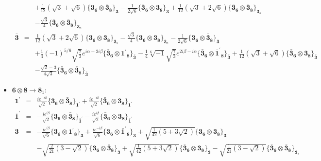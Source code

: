 \documentclass[english]{article}
\newcommand{\subcg}[3]{\big\{ {#1}\otimes{#2}\big\}^{}_{#3}}
\newcommand{\rep}[1]{\mathbf{#1}}
\begin{document}
\begin{itemize}
\begin{eqnarray*}
 & & +\frac{1}{12} \left(\sqrt{3}+\sqrt{6}\right)\subcg{\rep{3}_{\rep{6}}}{\rep{\bar{3}}_{\rep{8}}}{\rep{3}}-\frac{1}{2 \sqrt{6}}\subcg{\rep{\bar{3}}_{\rep{6}}}{\rep{3}_{\rep{8}}}{\rep{3}}+\frac{1}{12} \left(\sqrt{3}+2 \sqrt{6}\right)\subcg{\rep{\bar{3}}_{\rep{6}}}{\rep{\bar{3}}_{\rep{8}}}{\rep{3}_{s}} \\ 
 & & -\frac{\sqrt{3}}{4}\subcg{\rep{\bar{3}}_{\rep{6}}}{\rep{\bar{3}}_{\rep{8}}}{\rep{3}_{a}}
\\
\rep{\bar{3}} &=& \frac{1}{12} \left(\sqrt{3}+2 \sqrt{6}\right)\subcg{\rep{3}_{\rep{6}}}{\rep{3}_{\rep{8}}}{\rep{\bar{3}}_{s}}-\frac{\sqrt{3}}{4}\subcg{\rep{3}_{\rep{6}}}{\rep{3}_{\rep{8}}}{\rep{\bar{3}}_{a}}-\frac{1}{2 \sqrt{6}}\subcg{\rep{3}_{\rep{6}}}{\rep{\bar{3}}_{\rep{8}}}{\rep{\bar{3}}} \\ 
 & & +\frac{1}{4} (-1)^{5/6} \sqrt{\frac{7}{3}} e^{i \alpha -2 i \beta }\subcg{\rep{\bar{3}}_{\rep{6}}}{\rep{1^{\prime}}_{\rep{8}}}{\rep{\bar{3}}}-\frac{1}{4} \sqrt[6]{-1} \sqrt{\frac{7}{3}} e^{2 i \beta -i \alpha }\subcg{\rep{\bar{3}}_{\rep{6}}}{\rep{\bar{1}^{\prime}}_{\rep{8}}}{\rep{\bar{3}}}+\frac{1}{12} \left(\sqrt{3}+\sqrt{6}\right)\subcg{\rep{\bar{3}}_{\rep{6}}}{\rep{3}_{\rep{8}}}{\rep{\bar{3}}} \\ 
 & & -\frac{\sqrt{2}-3}{4 \sqrt{3}}\subcg{\rep{\bar{3}}_{\rep{6}}}{\rep{\bar{3}}_{\rep{8}}}{\rep{\bar{3}}}
\end{eqnarray*}
\item $\rep{6}\otimes\rep{8}\to\rep{8}_{1}$:
\begin{eqnarray*}
\rep{1^{\prime}} &=& \frac{i e^{-i \beta }}{\sqrt{2}}\subcg{\rep{3}_{\rep{6}}}{\rep{\bar{3}}_{\rep{8}}}{\rep{1^{\prime}}}+\frac{i e^{-i \beta }}{\sqrt{2}}\subcg{\rep{\bar{3}}_{\rep{6}}}{\rep{3}_{\rep{8}}}{\rep{1^{\prime}}}
\\
\rep{\bar{1}^{\prime}} &=& -\frac{i e^{i \beta }}{\sqrt{2}}\subcg{\rep{3}_{\rep{6}}}{\rep{\bar{3}}_{\rep{8}}}{\rep{\bar{1}^{\prime}}}-\frac{i e^{i \beta }}{\sqrt{2}}\subcg{\rep{\bar{3}}_{\rep{6}}}{\rep{3}_{\rep{8}}}{\rep{\bar{1}^{\prime}}}
\\
\rep{3} &=& -\frac{i e^{i \beta }}{\sqrt{6}}\subcg{\rep{3}_{\rep{6}}}{\rep{1^{\prime}}_{\rep{8}}}{\rep{3}}+\frac{i e^{-i \beta }}{\sqrt{6}}\subcg{\rep{3}_{\rep{6}}}{\rep{\bar{1}^{\prime}}_{\rep{8}}}{\rep{3}}+\sqrt{\frac{1}{42} \left(5+3 \sqrt{2}\right)}\subcg{\rep{3}_{\rep{6}}}{\rep{3}_{\rep{8}}}{\rep{3}} \\ 
 & & -\sqrt{\frac{2}{21} \left(3-\sqrt{2}\right)}\subcg{\rep{3}_{\rep{6}}}{\rep{\bar{3}}_{\rep{8}}}{\rep{3}}+\sqrt{\frac{1}{42} \left(5+3 \sqrt{2}\right)}\subcg{\rep{\bar{3}}_{\rep{6}}}{\rep{3}_{\rep{8}}}{\rep{3}}-\sqrt{\frac{1}{21} \left(3-\sqrt{2}\right)}\subcg{\rep{\bar{3}}_{\rep{6}}}{\rep{\bar{3}}_{\rep{8}}}{\rep{3}_{s}}

\end{eqnarray*}
\end{itemize}
\end{document}
